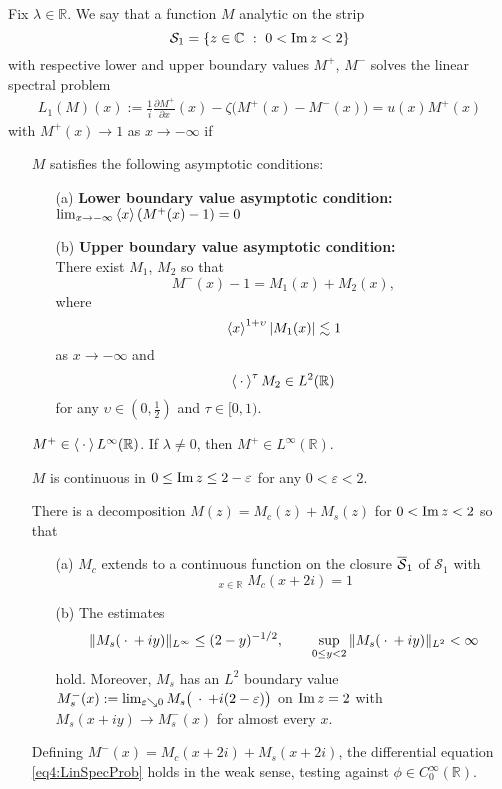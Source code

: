 \documentclass[../dissertation.tex]{subfiles}
\begin{document}
\begin{defn}\label{dfn4:DEsoln}
	Fix $\lambda \in \mathbb R$. We say that a function $M$ analytic on the strip
	$$\mathcal S_1 = \{ z \in \mathbb C ~:~ 0 < \operatorname{Im} z < 2 \}$$ with respective
	lower and upper boundary values $M^+$, $M^-$ solves the linear spectral problem
	\begin{align} \label{eq4:LinSpecProb}
		L_1(M)(x) 
			:= \frac{1}{i} \frac{\partial M^+}{\partial x}(x)
				- \zeta \big(M^+(x) - M^-(x)\big)
			= u(x) M^+(x)
	\end{align}
	with $M^+(x) \to 1$ as $x\to -\infty$ if 
	\begin{itemize}
		\item[\namedlabel{itm:asymp}{(i)}] $M$ satisfies the following asymptotic conditions:
			\begin{itemize}
				\item[(a)] \textbf{Lower boundary value asymptotic condition:}\\
					$\lim_{x\to-\infty} \left\langle x \right\rangle \left(M^+(x) -1\right)=0$
				\item[(b)] \textbf{Upper boundary value asymptotic condition:}\\
					There exist $M_1$, $M_2$ so that 
					\[
						M^-(x) -1 = M_1(x) + M_2(x), 
					\]
					where 
					\[
						\left\langle x \right\rangle^{1+\upsilon} | M_1(x) | \lesssim 1
					\]
					as $x\to -\infty$ and 
					\[
						\left\langle \kern 0.5ex \cdot \kern 0.5ex \right\rangle^\tau M_2 \in L^2(\mathbb R)
					\]
					for any $\upsilon \in \left(0, \frac{1}{2}\right)$ and $\tau \in [0,1)$.
			\end{itemize} 
		\item[\namedlabel{itm:space}{(ii)}] $M^+ \in \left\langle \kern 0.5ex \cdot \kern 0.5ex \right\rangle L^\infty(\mathbb R)$. 
			If $\lambda \ne 0$, then $M^+ \in L^\infty(\mathbb R)$.
		\item[\namedlabel{itm:cont}{(iii)}] $M$ is continuous in $0 \leq \operatorname{Im} z \leq 2-\varepsilon$
			for any $0 < \varepsilon < 2$.
		\item[\namedlabel{itm:decomp}{(iv)}] There is a decomposition $M(z) = M_c(z) + M_s(z)$ for 
			$0 < \operatorname{Im}  z < 2$ so that 
			\begin{itemize}
				\item[(a)] $M_c$ extends to a continuous function on the closure
					$\overline{\mathcal S}_1$ of $\mathcal S_1$ with 
					\[
						\mathop{\lim_{x\to-\infty}}_{x\in \mathbb R} M_c(x+2i) = 1	
					\]
				\item[(b)] The estimates
					\[
						\|M_s(\kern 0.5ex \cdot \kern 0.5ex+iy)\|_{L^\infty} \leq (2-y)^{-1/2}, \qquad
						\sup_{0\leq y < 2} \|M_s(\kern 0.5ex \cdot \kern 0.5ex+iy)\|_{L^2} < \infty
					\]
					hold. Moreover, $M_s$ has an $L^2$ boundary value 
					$M_s^-(x):= \lim_{\varepsilon \searrow 0} M_s\big(\kern 0.5ex \cdot \kern 0.5ex+i(2-\varepsilon)\big)$
					on $\operatorname{Im} z = 2$ with $M_s(x+iy) \to M_s^-(x)$ for almost every
					$x$.
			\end{itemize}
		\item[\namedlabel{itm:jost}{(v)}] Defining $M^-(x) = M_c(x+2i) + M_s(x+2i)$, the differential equation
			\eqref{eq4:LinSpecProb} holds in the weak sense, testing against 
			$\phi \in C_0^\infty(\mathbb R)$.
	\end{itemize}
\end{defn}
\end{document}
